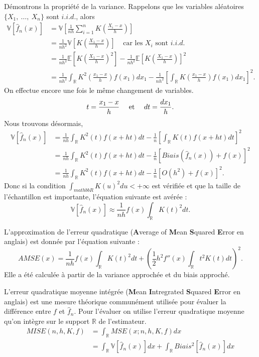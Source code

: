 \documentclass[
]{book}
\begin{document}
\begin{demo}
Démontrons la propriété de la variance.
Rappelons que les variables aléatoires $\{ X_1,~\dots, ~X_n\}$ sont $i.i.d.$, alors
$$
\begin{aligned}
\mathbb V  \left[ \hat f_n(x) \right] &= \mathbb V \left[ \frac1{nh} \sum\limits_{i=1}^n K\left(\frac{X_i-x}h\right) \right] \\
&= \frac1{nh^2} \mathbb V \left[  K\left(\frac{X_1-x}h\right) \right] ~~~~~\text{car les } X_i \text{ sont }i.i.d.\\
&= \frac1{nh^2} \mathbb E \left[  K\left(\frac{X_1-x}h\right)^2 \right] - \frac1{nh^2} \mathbb E \left[  K\left(\frac{X_1-x}h\right) \right]^2\\
&= \frac1{nh^2} \int_{\mathbb R}  K^2\left(\frac{x_1-x}h\right) f(x_1)dx_1 - \frac1{nh^2} \left[\int_{\mathbb R}  K\left(\frac{x_1-x}h\right) f(x_1)dx_1\right]^2.
\end{aligned}
$$
On effectue encore une fois le même changement de variables.
$$t=\frac{x_1-x}h ~~~~\hbox{et}~~~~dt =\frac{dx_1}h.$$
Nous trouvons désormais,
$$
\begin{aligned}
\mathbb V  \left[ \hat f_n(x) \right] &= \frac1{nh} \int_{\mathbb R}  K^2\left(t\right) f(x+ht)dt - \frac1{n} \left[\int_{\mathbb R}  K\left(t\right) f(x+ht)dt\right]^2\\
&= \frac1{nh} \int_{\mathbb R}  K^2\left(t\right) f(x+ht)dt - \frac1{n} \left[Biais \left( \hat f_n(x) \right) +f(x)\right]^2\\
&= \frac1{nh} \int_{\mathbb R}  K^2\left(t\right) f(x+ht)dt - \frac1{n} \left[O \left( h^2 \right) +f(x)\right]^2.
\end{aligned}
$$
Donc si la condition $\int_{mathbb R}K(u)^2du<+\infty$ est vérifiée et que la taille de l'échantillon est importante, l'équation suivante est avérée : 
$$\mathbb V \left[ \hat f_n(x) \right] \approx \frac1{nh} f(x) \int_{\mathbb R}K(t)^2 dt.$$

\end{demo}

L'approximation de l'erreur quadratique (\textbf{A}verage of \textbf{M}ean \textbf{S}quared \textbf{E}rror en anglais) est donnée par l'équation suivante :\\
\[
AMSE(x)= \frac1{nh} f(x) \int_{\mathbb R}K(t)^2 dt + \left(\frac12h^2f''(x)\int_{\mathbb R} t^2K(t) dt \right)^2.
\]
Elle a été calculée à partir de la variance approchée et du biais approché.

L'erreur quadratique moyenne intégrée (\textbf{M}ean \textbf{I}ntregrated \textbf{S}quared \textbf{E}rror en anglais) est une mesure théorique communément utilisée pour évaluer la différence entre \(f\) et \(\hat f_n\). Pour l'évaluer on utilise l'erreur quadratique moyenne qu'on intègre sur le support \(\mathbb R\) de l'estimateur.
\[
\begin{aligned}
MISE(n,h,K,f) &= \int_{\mathbb R}MSE(x;n,h,K,f)dx\\
&= \int_{\mathbb R} \mathbb V\left[ \hat f_n(x) \right]  dx+ \int_{\mathbb R} Biais^2 \left[ \hat f_n(x) \right]dx
\end{aligned}
\]
\end{document}
